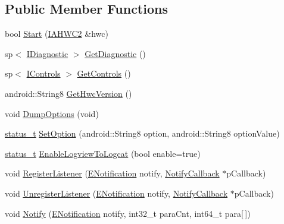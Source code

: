 \subsection*{Public Member Functions}
\begin{DoxyCompactItemize}
\item 
bool \mbox{\hyperlink{classandroid_1_1HwcService_a696bd30240b25fb0ec210fbaa943b3e9}{Start}} (\mbox{\hyperlink{classandroid_1_1IAHWC2}{I\+A\+H\+W\+C2}} \&hwc)
\item 
sp$<$ \mbox{\hyperlink{classhwcomposer_1_1IDiagnostic}{I\+Diagnostic}} $>$ \mbox{\hyperlink{classandroid_1_1HwcService_ad8be9ec253b8072a1055700d88e5d8c1}{Get\+Diagnostic}} ()
\item 
sp$<$ \mbox{\hyperlink{classhwcomposer_1_1IControls}{I\+Controls}} $>$ \mbox{\hyperlink{classandroid_1_1HwcService_af5edb452f1564f0b4b70e3d58e4982f7}{Get\+Controls}} ()
\item 
android\+::\+String8 \mbox{\hyperlink{classandroid_1_1HwcService_a322632377b643c73a461dca0475d5e1f}{Get\+Hwc\+Version}} ()
\item 
void \mbox{\hyperlink{classandroid_1_1HwcService_addb78964103305845ce09edf2ef31a5c}{Dump\+Options}} (void)
\item 
\mbox{\hyperlink{hwcserviceapi_8h_a3806fb2027d9a316d8ca8d9b8b8eb96f}{status\+\_\+t}} \mbox{\hyperlink{classandroid_1_1HwcService_afbbee67c5f3220d22d7a319f09dc0314}{Set\+Option}} (android\+::\+String8 option, android\+::\+String8 option\+Value)
\item 
\mbox{\hyperlink{hwcserviceapi_8h_a3806fb2027d9a316d8ca8d9b8b8eb96f}{status\+\_\+t}} \mbox{\hyperlink{classandroid_1_1HwcService_a3a1044ce7389aae85f309c159a533f73}{Enable\+Logview\+To\+Logcat}} (bool enable=true)
\item 
void \mbox{\hyperlink{classandroid_1_1HwcService_a70e88e6da20467baf70f33cfe341583c}{Register\+Listener}} (\mbox{\hyperlink{classandroid_1_1HwcService_a34049a831dd1c85ef002e59be99d1bd8}{E\+Notification}} notify, \mbox{\hyperlink{classandroid_1_1HwcService_1_1NotifyCallback}{Notify\+Callback}} $\ast$p\+Callback)
\item 
void \mbox{\hyperlink{classandroid_1_1HwcService_a8da7d6a6c098ab6334308a94c9508e84}{Unregister\+Listener}} (\mbox{\hyperlink{classandroid_1_1HwcService_a34049a831dd1c85ef002e59be99d1bd8}{E\+Notification}} notify, \mbox{\hyperlink{classandroid_1_1HwcService_1_1NotifyCallback}{Notify\+Callback}} $\ast$p\+Callback)
\item 
void \mbox{\hyperlink{classandroid_1_1HwcService_a9ad9aea8e753da4d2267fd5ffa0afff4}{Notify}} (\mbox{\hyperlink{classandroid_1_1HwcService_a34049a831dd1c85ef002e59be99d1bd8}{E\+Notification}} notify, int32\+\_\+t para\+Cnt, int64\+\_\+t para\mbox{[}$\,$\mbox{]})
\end{DoxyCompactItemize}
